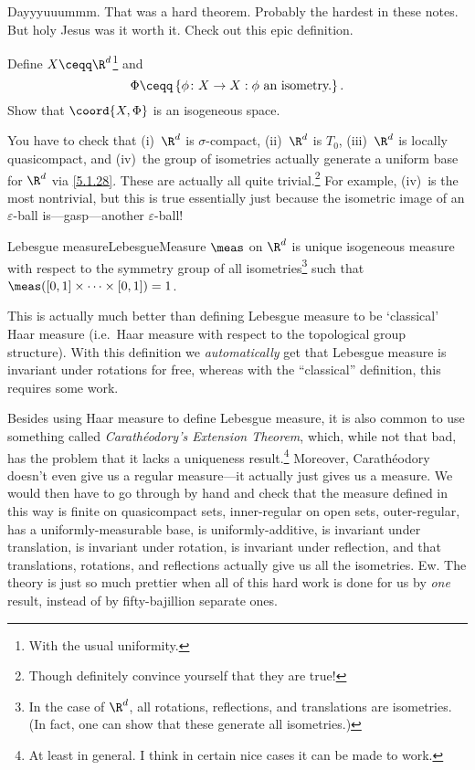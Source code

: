 Dayyyuuummm.  That was a hard theorem.  Probably the hardest in these notes.  But holy Jesus was it worth it.  Check out this epic definition.
\begin{exr}{}{}
Define $X\ceqq \R ^d$\footnote{With the usual uniformity.} and
\begin{equation}
\Phi \ceqq \left\{ \phi \colon X\rightarrow X:\phi \text{ an isometry.}\right\} .
\end{equation}
Show that $\coord{X,\Phi}$ is an isogeneous space.
\begin{rmk}
You have to check that (i)~$\R ^d$ is $\sigma$-compact, (ii)~$\R ^d$ is $T_0$, (iii)~$\R ^d$ is locally quasicompact, and (iv)~the group of isometries actually generate a uniform base for $\R ^d$ via \eqref{5.1.28}.  These are actually all quite trivial.\footnote{Though definitely convince yourself that they are true!}  For example, (iv)~is the most nontrivial, but this is true essentially just because the isometric image of an $\varepsilon$-ball is---gasp---another $\varepsilon$-ball!
\end{rmk}
\end{exr}
\begin{dfn}{Lebesgue measure}{LebesgueMeasure}
 $\meas$ on $\R ^d$ is unique isogeneous measure with respect to the symmetry group of all isometries\footnote{In the case of $\R ^d$, all rotations, reflections, and translations are isometries.  (In fact, one can show that these generate all isometries.)} such that $\meas ([0,1]\times \cdots \times [0,1])=1$.
\begin{rmk}
This is actually much better than defining Lebesgue measure to be `classical' Haar measure (i.e.~Haar measure with respect to the topological group structure).  With this definition we \emph{automatically} get that Lebesgue measure is invariant under rotations for free, whereas with the ``classical'' definition, this requires some work.
\end{rmk}
\begin{rmk}
Besides using Haar measure to define Lebesgue measure, it is also common to use something called \emph{Carathéodory's Extension Theorem}, which, while not that bad, has the problem that it lacks a uniqueness result.\footnote{At least in general.  I think in certain nice cases it can be made to work.}  Moreover, Carathéodory doesn't even give us a regular measure---it actually just gives us a measure.  We would then have to go through by hand and check that the measure defined in this way is finite on quasicompact sets, inner-regular on open sets, outer-regular, has a uniformly-measurable base, is uniformly-additive, is invariant under translation, is invariant under rotation, is invariant under reflection, and that translations, rotations, and reflections actually give us all the isometries.  Ew.  The theory is just so much prettier when all of this hard work is done for us by \emph{one} result, instead of by fifty-bajillion separate ones.
\end{rmk}
\end{dfn}

